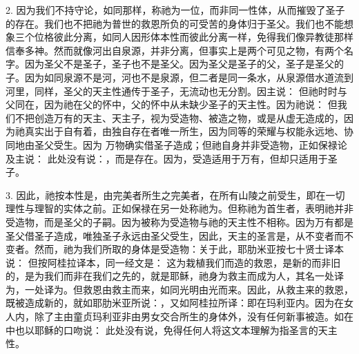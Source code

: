 2. 因为我们不持守论，如同那样，称祂为一位，而非同一性体，从而摧毁了圣子的存在。我们也不把祂为普世的救恩所负的可受苦的身体归于圣父。我们也不能想象三个位格彼此分离，如同人因形体本性而彼此分离一样，免得我们像异教徒那样信奉多神。然而就像河出自泉源，并非分离，但事实上是两个可见之物，有两个名字。因为圣父不是圣子，圣子也不是圣父。因为圣父是圣子的父，圣子是圣父的子。因为如同泉源不是河，河也不是泉源，但二者是同一条水，从泉源借水道流到河里，同样，圣父的天主性通传于圣子，无流动也无分割。因主说： 但祂时时与父同在，因为祂在父的怀中，父的怀中从未缺少圣子的天主性。因为祂说： 但我们不把创造万有的天主、天主子，视为受造物、被造之物，或是从虚无造成的，因为祂真实出于自有着，由独自存在者唯一所生，因为同等的荣耀与权能永远地、协同地由圣父受生。因为 万物确实借圣子造成；但祂自身并非受造物，正如保禄论及主说： 此处没有说：，而是存在。因为，受造适用于万有，但却只适用于圣子。\par

3. 因此，祂按本性是，由完美者所生之完美者，在所有山陵之前受生，即在一切理性与理智的实体之前。正如保禄在另一处称祂为。但称祂为首生者，表明祂并非受造物，而是圣父的子嗣。因为被称为受造物与祂的天主性不相称。因为万有都是圣父借圣子造成，唯独圣子永远由圣父受生，因此，天主的圣言是，从不变者而不变者。然而，祂为我们所取的身体是受造物：关于此，耶肋米亚按七十贤士译本说： 但按阿桂拉译本，同一经文是： 这为栽植我们而造的救恩，是新的而非旧的，是为我们而非在我们之先的，就是耶稣，祂身为救主而成为人，其名一处译为，一处译为。但救恩由救主而来，如同光明由光而来。因此，从救主来的救恩，既被造成新的，就如耶肋米亚所说：，又如阿桂拉所译：即在玛利亚内。因为在女人内，除了主由童贞玛利亚非由男女交合所生的身体外，没有任何新事被造。如在中也以耶稣的口吻说： 此处没有说，免得任何人将这文本理解为指圣言的天主性。\par

